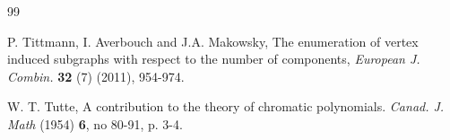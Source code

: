 \documentclass[review]{elsarticle}
\begin{document}
\begin{thebibliography}{99}


 P. Tittmann, I. Averbouch and J.A. Makowsky, The enumeration of vertex induced subgraphs with respect to the number of components, {\it European J. Combin.} {\bf 32} (7) (2011), 954-974.

 W. T. Tutte, A contribution to the theory of chromatic polynomials. {\it Canad. J. Math} (1954) {\bf 6}, no 80-91, p. 3-4.



\end{thebibliography}
\end{document}
